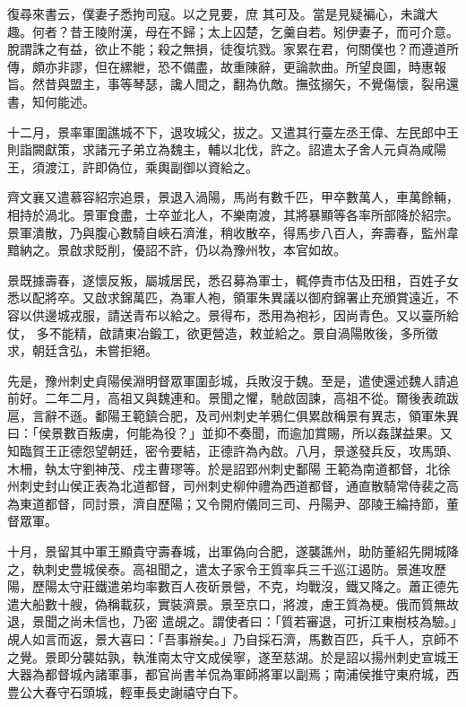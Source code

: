 \begin{pinyinscope}
 復尋來書云，僕妻子悉拘司寇。以之見要，庶
 其可及。當是見疑褊心，未識大趣。何者？昔王陵附漢，母在不歸；太上囚楚，乞羹自若。矧伊妻子，而可介意。脫謂誅之有益，欲止不能；殺之無損，徒復坑戮。家累在君，何關僕也？而遵道所傳，頗亦非謬，但在縲紲，恐不備盡，故重陳辭，更論款曲。所望良圖，時惠報旨。然昔與盟主，事等琴瑟，讒人間之，翻為仇敵。撫弦搦矢，不覺傷懷，裂帛還書，知何能述。



 十二月，景率軍圍譙城不下，退攻城父，拔之。又遣其行臺左丞王偉、左民郎中王則詣闕獻策，求諸元子弟立為魏主，輔以北伐，許之。詔遣太子舍人元貞為咸陽王，須渡江，許即偽位，乘輿副御以資給之。



 齊文襄又遣慕容紹宗追景，景退入渦陽，馬尚有數千匹，甲卒數萬人，車萬餘輛，相持於渦北。景軍食盡，士卒並北人，不樂南渡，其將暴顯等各率所部降於紹宗。景軍潰散，乃與腹心數騎自峽石濟淮，稍收散卒，得馬步八百人，奔壽春，監州韋黯納之。景啟求貶削，優詔不許，仍以為豫州牧，本官如故。



 景既據壽春，遂懷反叛，屬城居民，悉召募為軍士，輒停責市估及田租，百姓子女悉以配將卒。又啟求錦萬匹，為軍人袍，領軍朱異議以御府錦署止充頒賞遠近，不容以供邊城戎服，請送青布以給之。景得布，悉用為袍衫，因尚青色。又以臺所給仗，
 多不能精，啟請東冶鍛工，欲更營造，敕並給之。景自渦陽敗後，多所徵求，朝廷含弘，未嘗拒絕。



 先是，豫州刺史貞陽侯淵明督眾軍圍彭城，兵敗沒于魏。至是，遣使還述魏人請追前好。二年二月，高祖又與魏連和。景聞之懼，馳啟固諫，高祖不從。爾後表疏跋扈，言辭不遜。鄱陽王範鎮合肥，及司州刺史羊鴉仁俱累啟稱景有異志，領軍朱異曰：「侯景數百叛虜，何能為役？」並抑不奏聞，而逾加賞賜，所以姦謀益果。又知臨賀王正德怨望朝廷，密令要結，正德許為內啟。八月，景遂發兵反，攻馬頭、木柵，執太守劉神茂、戍主曹璆等。於是詔郢州刺史鄱陽
 王範為南道都督，北徐州刺史封山侯正表為北道都督，司州刺史柳仲禮為西道都督，通直散騎常侍裴之高為東道都督，同討景，濟自歷陽；又令開府儀同三司、丹陽尹、邵陵王綸持節，董督眾軍。



 十月，景留其中軍王顯貴守壽春城，出軍偽向合肥，遂襲譙州，助防董紹先開城降之，執刺史豊城侯泰。高祖聞之，遣太子家令王質率兵三千巡江遏防。景進攻歷陽，歷陽太守莊鐵遣弟均率數百人夜斫景營，不克，均戰沒，鐵又降之。蕭正德先遣大船數十艘，偽稱載荻，實裝濟景。景至京口，將渡，慮王質為梗。俄而質無故退，景聞之尚未信也，乃密
 遣覘之。謂使者曰：「質若審退，可折江東樹枝為驗。」覘人如言而返，景大喜曰：「吾事辦矣。」乃自採石濟，馬數百匹，兵千人，京師不之覺。景即分襲姑孰，執淮南太守文成侯寧，遂至慈湖。於是詔以揚州刺史宣城王大器為都督城內諸軍事，都官尚書羊侃為軍師將軍以副焉；南浦侯推守東府城，西豊公大春守石頭城，輕車長史謝禧守白下。




\end{pinyinscope}

